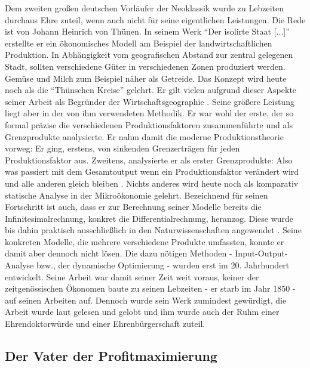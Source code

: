 Dem zweiten großen deutschen Vorläufer der Neoklassik wurde zu Lebzeiten durchaus Ehre zuteil, wenn auch nicht für seine eigentlichen Leistungen. Die Rede ist von Johann Heinrich von Thünen. In seinem Werk "`Der isolirte Staat [...]"' \textcite{Thunen1826} erstellte er ein ökonomisches Modell am Beispiel der landwirtschaftlichen Produktion. In Abhängigkeit vom geografischen Abstand zur zentral gelegenen Stadt, sollten verschiedene Güter in verschiedenen Zonen produziert werden. Gemüse und Milch zum Beispiel näher als Getreide. Das Konzept wird heute noch als die "`Thünschen Kreise"' gelehrt. Er gilt vielen aufgrund dieser Aspekte seiner Arbeit als Begründer der Wirtschaftsgeographie \parencite[S. 283]{Kurz2009}. Seine größere Leistung liegt aber in der von ihm verwendeten Methodik. Er war wohl der erste, der so formal präzise die verschiedenen Produktionsfaktoren zusammenführte und als Grenzprodukte analysierte. Er nahm damit die moderne Produktionstheorie vorweg: Er ging, erstens, von sinkenden Grenzerträgen für jeden Produktionsfaktor aus. Zweitens, analysierte er als erster Grenzprodukte: Also was passiert mit dem Gesamtoutput wenn ein Produktionsfaktor verändert wird und alle anderen gleich bleiben \parencite[S. 282]{Rosner2012}. Nichts anderes wird heute noch als komparativ statische Analyse in der Mikroökonomie gelehrt. Bezeichnend für seinen Fortschritt ist auch, dass er zur Berechnung seiner Modelle bereits die Infinitesimalrechnung, konkret die Differentialrechnung, heranzog. Diese wurde bis dahin praktisch ausschließlich in den Naturwissenschaften angewendet \parencite[S. 202]{Ekelund2002}. Seine konkreten Modelle, die mehrere verschiedene Produkte umfassten, konnte er damit aber dennoch nicht lösen. Die dazu nötigen Methoden - Input-Output-Analyse bzw., der dynamische Optimierung - wurden erst im 20. Jahrhundert entwickelt. Seine Arbeit war damit seiner Zeit weit voraus, keiner der zeitgenössischen Ökonomen baute zu seinen Lebzeiten - er starb im Jahr 1850 - auf seinen Arbeiten auf. Dennoch wurde sein Werk zumindest gewürdigt, die Arbeit wurde laut \textcite[S. 283]{Rosner2012} gelesen und gelobt und ihm wurde auch der Ruhm einer Ehrendoktorwürde und einer Ehrenbürgerschaft zuteil.

\subsection{Der Vater der Profitmaximierung}

